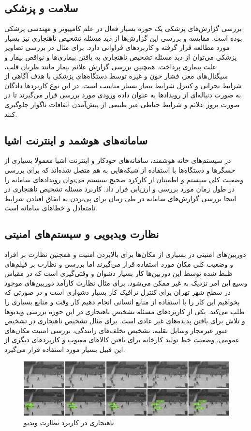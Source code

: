\documentclass[12pt,a4paper]{report}
\theoremstyle{definition}
\theoremstyle{definition}
\begin{document}
\subsection{سلامت و پزشکی}
بررسی گزارش‌های پزشکی یک حوزه بسیار فعال در علم کامپیوتر و مهندسی پزشکی بوده است. مقایسه و بررسی این گزارش‌ها از دید مسئله تشخیص ناهنجاری نیز بسیار مورد مطالعه قرار گرفته و کاربرد‌های فراوانی دارد. برای مثال در بررسی تصاویر پزشکی می‌توان از دید مسئله تشخیص ناهنجاری به یافتن بیماری‌ها و نواقص بیمار و علت بیماری پرداخت. همچنین بررسی 
گزارش علائم بیمار مانند ظربان قلب، سیگنال‌های مغز، فشار خون و غیره توسط دستگاه‌های پزشکی با هدف آگاهی از شرایط بحرانی و کنترل شرایط بیمار بسیار مناسب است. در این نوع کاربرد‌ها دادگان به صورت دنباله‌ای از رویداد‌ها به عنوان داده ورودی مورد بررسی قرار می‌گیرند تا در صورت بروز علائم و شرایط حیاطی غیر طبیعی از پیش‌آمدن اتفاقات ناگوار جلوگیری کنند.
\subsection{سامانه‌های هوشمد و اینترنت اشیا}
در سیستم‌های خانه هوشمند، سامانه‌های خودکار و اینترنت اشیا معمولا بسیاری از حسگر‌ها و دستگاه‌ها با استفاده از شبکه‌هایی به هم متصل شده‌اند که برای بررسی وضعیت کلی سیستم و اطمینان از کارکرد صحیح سیستم می‌توان رویداد‌های سامانه را در طول زمان مورد بررسی و ارزیابی قرار داد. کاربرد مسئله تشخیص ناهنجاری در اینجا بررسی گزارش‌های سامانه در طی زمان برای پی‌بردن به اتفاق افتادن شرایط نامتعادل و خطا‌های سامانه است.
\subsection{نظارت ویدیویی و سیستم‌های امنیتی}
دوربین‌های امنیتی در بسیاری از مکان‌ها برای بالابردن امنیت و همچنین نظارت بر افراد و وضعیت کلی مکان مورد استفاده قرار می‌گیرند اما بررسی و نظارت بر فیلم‌های ظبط شده توسط این دوربین‌ها کار بسیار دشوان و وقتی‌گیری است که در مقیاس وسیع این امر نزدیک به غیر ممکن می‌شود. برای مثال نظارت کار‌آمد دوربین‌های موجود در سطح شهر تهران برای کنترل ترافیک کار بسیار دشواری است و در صورتی که بخواهیم این کار را با استفاده از منابع انسانی انجام دهیم کار وقت و منابع بسیاری را طلب می‌کند. یکی از کاربرد‌های مسئله تشخیص ناهنجاری در این حوزه بررسی ویدیو‌ها و تلاش برای یافتن پدیده‌های غیر عادی است. برای مثال تشخیص ناهنجاری در تشخیص عبور غیرمجاز وسایل نقلیه، تشخیص تخلف‌های رانندگی، بررسی امنیت مکان‌های عمومی، وضعیت خط تولید کارخانه برای یافتن کالاهای معیوب و کاربرد‌های دیگری از این قبیل بسیار مورد استفاده قرار می‌گیرد.
\begin{figure}[!hp]
	\begin{center}
		\includegraphics[width=\linewidth]{./images/figures/walkway-anomaly.png}
		\caption{ناهنجاری در کاربرد نظارت ویدیو~\cite{10.1016/j.compeleceng.2019.02.017}}
		\label{fig:walkway-anomaly}
	\end{center}
\end{figure}
\end{document}

